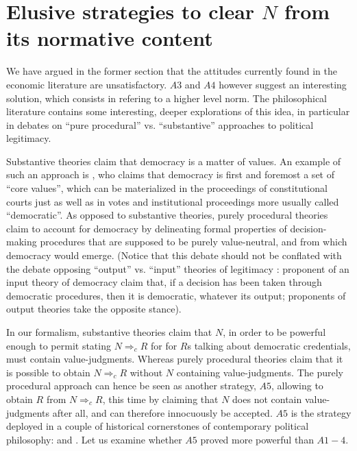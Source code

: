 \documentclass[preprint, french, english, 11pt, authoryear]{elsarticle}%
\newcommand{\protectforpdf}[1]{\texorpdfstring{\ensuremath{#1}}{#1}}
\begin{document}
\section{Elusive strategies to clear \protectforpdf{N} from its normative content}
We have argued in the former section that the attitudes currently found in the economic literature are unsatisfactory. $A3$ and $A4$ however suggest an interesting solution, which consists in refering to a higher level norm. The philosophical literature contains some interesting, deeper explorations of this idea, in particular in debates on ``pure procedural'' vs. ``substantive'' approaches to political legitimacy.

Substantive theories claim that democracy is a matter of values. An example of such an approach is \cite{brettschneider_value_2006}, who claims that democracy is first and foremost a set of ``core values'', which can be materialized in the proceedings of constitutional courts just as well as in votes and institutional proceedings more usually called ``democratic''. As opposed to substantive theories, purely procedural theories claim to account for democracy by delineating formal properties of decision-making procedures that are supposed to be purely value-neutral, and from which democracy would emerge. (Notice that this debate should not be conflated with the debate opposing “output” vs. “input” theories of legitimacy \citep{vatn_environmental_2016, backstrand_environmental_2010}: proponent of an input theory of democracy claim that, if a decision has been taken through democratic procedures, then it is democratic, whatever its output; proponents of output theories take the opposite stance).

In our formalism, substantive theories claim that $N$, in order to be powerful enough to permit stating $N ⇒_c R$ for for $R$s talking about democratic credentials, must contain value-judgments. Whereas purely procedural theories claim that it is possible to obtain $N ⇒_c R$ without $N$ containing value-judgments. The purely procedural approach can hence be seen as another strategy, $A5$, allowing to obtain $R$ from $N ⇒_c R$, this time by claiming that $N$ does not contain value-judgments after all, and can therefore innocuously be accepted. $A5$ is the strategy deployed in a couple of historical cornerstones of contemporary political philosophy: \cite{rawls_political_2005} and \cite{habermas_moralbewustsein_1983}. Let us examine whether $A5$ proved more powerful than $A1-4$.
\end{document}
